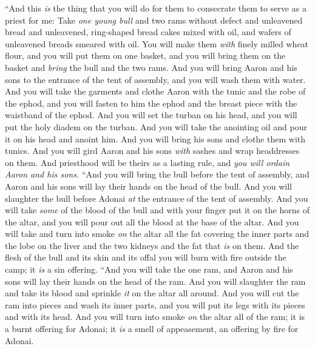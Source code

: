 \begin{biblechapter} %
 “And this \textit{is} the thing that you will do for them to consecrate them to serve as a priest for me: Take \textit{one young bull} and two rams without defect
\verse and unleavened bread and unleavened, ring-shaped bread cakes mixed with oil, and wafers of unleavened breads smeared with oil. You will make them \textit{with} finely milled wheat flour,
\verse and you will put them on one basket, and you will bring them on the basket and \textit{bring} the bull and the two rams.
\verse And you will bring Aaron and his sons to the entrance of the tent of assembly, and you will wash them with water.
\verse And you will take the garments and clothe Aaron with the tunic and the robe of the ephod, and you will fasten to him the ephod and the breast piece with the waistband of the ephod.
\verse And you will set the turban on his head, and you will put the holy diadem on the turban.
\verse And you will take the anointing oil and pour it on his head and anoint him.
\verse And you will bring his sons and clothe them with tunics.
\verse And you will gird Aaron and his sons \textit{with} sashes and wrap headdresses on them. And priesthood will be theirs as a lasting rule, and \textit{you will ordain Aaron and his sons.}
\verse “And you will bring the bull before the tent of assembly, and Aaron and his sons will lay their hands on the head of the bull.
\verse And you will slaughter the bull before Adonai \textit{at} the entrance of the tent of assembly.
\verse And you will take \textit{some} of the blood of the bull and with your finger put it on the horns of the altar, and you will pour out all the blood at the base of the altar.
\verse And you will take and turn into smoke \textit{on} the altar all the fat covering the inner parts and the lobe on the liver and the two kidneys and the fat that \textit{is} on them.
\verse And the flesh of the bull and its skin and its offal you will burn with fire outside the camp; it \textit{is} a sin offering.
\verse “And you will take the one ram, and Aaron and his sons will lay their hands on the head of the ram.
\verse And you will slaughter the ram and take its blood and sprinkle \textit{it} on the altar all around.
\verse And you will cut the ram into pieces and wash its inner parts, and you will put its legs with its pieces and with its head.
\verse And you will turn into smoke \textit{on} the altar all of the ram; it is a burnt offering for Adonai; it \textit{is} a smell of appeasement, an offering by fire for Adonai.

\end{biblechapter}
